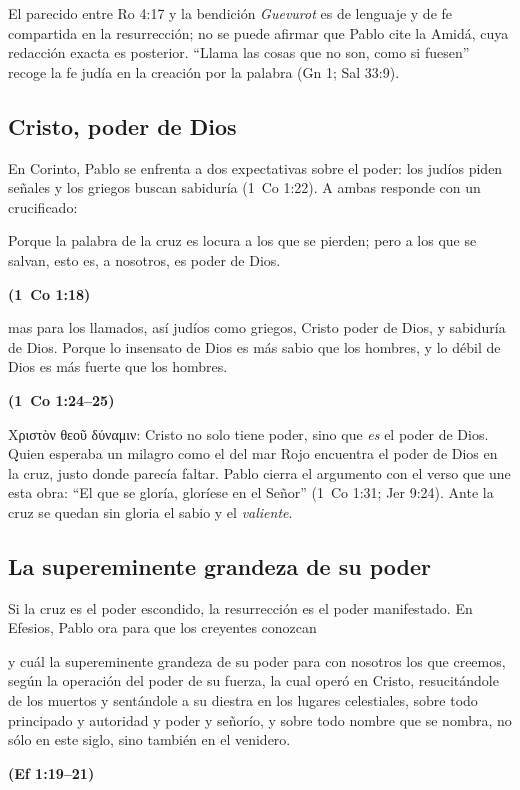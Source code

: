 \documentclass[11pt,letterpaper]{article}
\newcommand{\grc}[1]{\foreignlanguage{ancientgreek}{#1}}
\newcommand{\fuente}[1]{\par\hfill{\upshape\bfseries\small\textcolor{azul}{#1}}}
\begin{document}
\begin{nota}[Precisión]
El parecido entre Ro 4:17 y la bendición \emph{Guevurot} es de lenguaje y de fe compartida en la resurrección; no se puede afirmar que Pablo cite la Amidá, cuya redacción exacta es posterior. ``Llama las cosas que no son, como si fuesen'' recoge la fe judía en la creación por la palabra (Gn 1; Sal 33:9).
\end{nota}

\subsection{Cristo, poder de Dios}

En Corinto, Pablo se enfrenta a dos expectativas sobre el poder: los judíos piden señales y los griegos buscan sabiduría (1~Co 1:22). A ambas responde con un crucificado:

\begin{cita}Porque la palabra de la cruz es locura a los que se pierden; pero a los que se salvan, esto es, a nosotros, es poder de Dios.\fuente{(1~Co 1:18)}\end{cita}

\begin{cita}mas para los llamados, así judíos como griegos, Cristo poder de Dios, y sabiduría de Dios. Porque lo insensato de Dios es más sabio que los hombres, y lo débil de Dios es más fuerte que los hombres.\fuente{(1~Co 1:24--25)}\end{cita}

\grc{Χριστὸν θεοῦ δύναμιν}: Cristo no solo tiene poder, sino que \emph{es} el poder de Dios. Quien esperaba un milagro como el del mar Rojo encuentra el poder de Dios en la cruz, justo donde parecía faltar. Pablo cierra el argumento con el verso que une esta obra: ``El que se gloría, gloríese en el Señor'' (1~Co 1:31; Jer 9:24). Ante la cruz se quedan sin gloria el sabio y el \emph{valiente}.

\subsection{La supereminente grandeza de su poder}

Si la cruz es el poder escondido, la resurrección es el poder manifestado. En Efesios, Pablo ora para que los creyentes conozcan

\begin{cita}y cuál la supereminente grandeza de su poder para con nosotros los que creemos, según la operación del poder de su fuerza, la cual operó en Cristo, resucitándole de los muertos y sentándole a su diestra en los lugares celestiales, sobre todo principado y autoridad y poder y señorío, y sobre todo nombre que se nombra, no sólo en este siglo, sino también en el venidero.\fuente{(Ef 1:19--21)}\end{cita}
\end{document}
